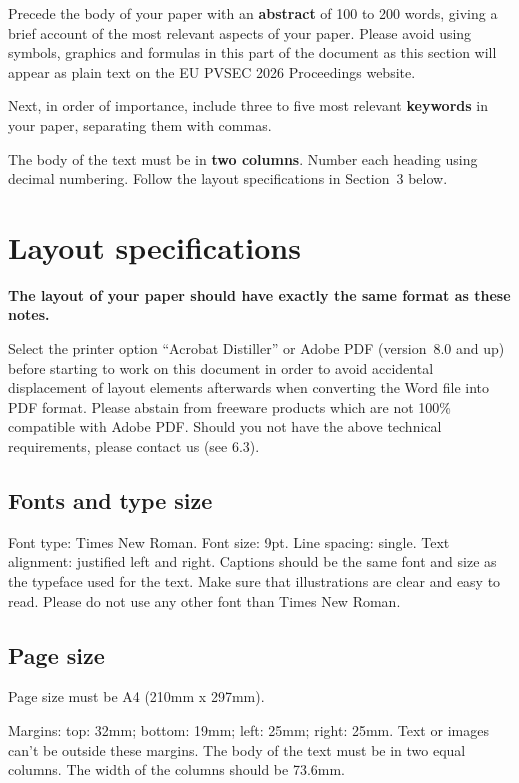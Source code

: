 \documentclass{eupvsec}
\begin{document}
Precede the body of your paper with an \textbf{abstract} of 100 to 200
words, giving a brief account of the most relevant aspects of your
paper. Please avoid using symbols, graphics and formulas in this part
of the document as this section will appear as plain text on the
EU PVSEC 2026 Proceedings website.

Next, in order of importance, include three to five most relevant
\textbf{keywords} in your paper, separating them with commas.

The body of the text must be in \textbf{two columns}. Number each
heading using decimal numbering. Follow the layout specifications in
Section~3 below.

\section{Layout specifications}

\textbf{The layout of your paper should have exactly the same format
as these notes.}

Select the printer option ``Acrobat Distiller'' or Adobe PDF
(version~8.0 and up) before starting to work on this document in order
to avoid accidental displacement of layout elements afterwards when
converting the Word file into PDF format. Please abstain from freeware
products which are not 100\% compatible with Adobe PDF. Should you not
have the above technical requirements, please contact us (see 6.3).

\subsection{Fonts and type size}

Font type: Times New Roman. Font size: 9pt. Line spacing: single. Text
alignment: justified left and right. Captions should be the same font
and size as the typeface used for the text. Make sure that
illustrations are clear and easy to read. Please do not use any other
font than Times New Roman.

\subsection{Page size}

Page size must be A4 (210mm x 297mm).

Margins: top: 32mm; bottom: 19mm; left: 25mm; right: 25mm. Text or
images can't be outside these margins. The body of the text must be
in two equal columns. The width of the columns should be 73.6mm.
\end{document}
